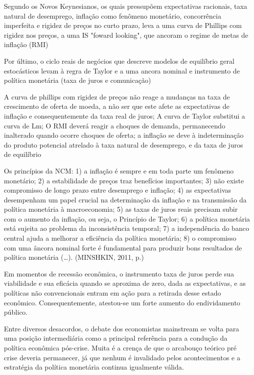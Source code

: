 \documentclass[report]{uftex}
\begin{document}
Segundo os Novos Keynesianos, os quais pressupõem expectativas racionais, taxa natural de desemprego, inflação como fenômeno monetário, concorrência imperfeita e rigidez de preços no curto prazo, leva a uma curva de Phillips com rigidez nos preços, a uma IS "foward looking", que ancoram o regime de metas de inflação (RMI)

Por último, o ciclo reais de negócios que descreve modelos de equilíbrio geral estocásticos levam à regra de Taylor e a uma ancora nominal e instrumento de política monetária (taxa de juros e comunicação)

A curva de phillips com rigidez de preços não reage a mudanças na taxa de crescimento de oferta de moeda, a não ser que este afete as expectativas de inflação e consequentemente da taxa real de juros; A curva de Taylor substitui a curva de Lm; O RMI deverá reagir a choques de demanda, permanecendo inalterado quando ocorre choques de oferta; a inflação se deve à indeterminação do produto potencial atrelado à taxa natural de desemprego, e da taxa de juros de equilíbrio

Os princípios da NCM: 1) a inflação é sempre e em toda parte um fenômeno monetário; 2) a estabilidade de preços traz benefícios importantes; 3) não existe compromisso de longo prazo entre desemprego e inflação; 4) as expectativas desempenham um papel crucial na determinação da inflação e na transmissão da política monetária à macroeconomia; 5) as taxas de juros reais precisam subir com o aumento da inflação, ou seja, o Princípio de Taylor; 6) a política monetária está sujeita ao problema da inconsistência temporal; 7) a independência do banco central ajuda a melhorar a eficiência da política monetária; 8) o compromisso com uma âncora nominal forte é fundamental para produzir bons resultados de política monetária (…). (MINSHKIN, 2011, p.)

Em momentos de recessão econômica, o instrumento taxa de juros perde sua viabilidade e sua eficácia quando se aproxima de zero, dada as expectativas, e as políticas não convencionais entram em ação para a retirada desse estado econômico. Consequentemente, atestou-se um forte aumento do endividamento público.

Entre diversos desacordos, o debate dos economistas mainstream se volta para uma posição intermediária como a principal referência para a condução da política econômica pós-crise. Muita é a crença de que o arcabouço teórico pré crise deveria permanecer, já que nenhum é invalidado pelos acontecimentos e a estratégia da política monetária continua igualmente válida. 
\end{document}
